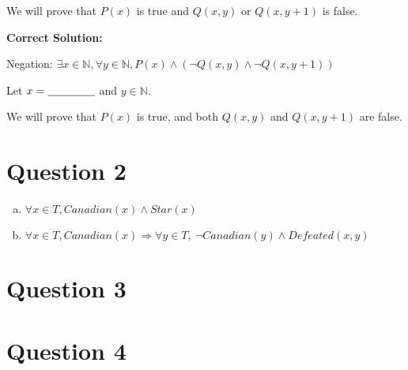 \documentclass[12pt]{article}
\begin{document}
\begin{enumerate}[a.]
    We will prove that $P(x)$ is true and $Q(x,y)$ or $Q(x, y+1)$ is false.

    \bigskip

    \textbf{Correct Solution:}

    Negation: $\exists x \in \mathbb{N}, \forall y \in \mathbb{N}, P(x) \land
    (\neg Q(x,y) \land \neg Q(x,y+1))$

    \bigskip

    Let $x = \underline{\hspace{1.5cm}}$ and $y \in \mathbb{N}$.

    We will prove that $P(x)$ is true, and both $Q(x,y)$ and $Q(x,y+1)$ are false.

\end{enumerate}

\section*{Question 2}
\begin{enumerate}[a.]
    \item

    $\forall x \in T, Canadian(x) \land Star(x)$

    \item

    $\forall x \in T, Canadian(x) \Rightarrow \forall y \in T,\:\neg Canadian(y) \land Defeated(x,y)$

\end{enumerate}

\section*{Question 3}

\section*{Question 4}
\end{document}
